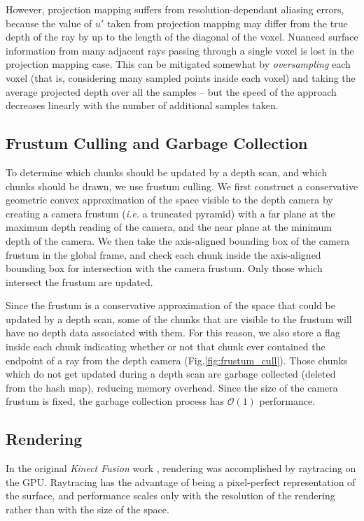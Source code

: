 \documentclass[10pt,twocolumn,letterpaper]{article}
\newcommand{\figref}[1]{Fig.\ref{#1}}
\begin{document}
However, projection mapping suffers from resolution-dependant aliasing errors,
because the value of $u'$ taken from projection mapping may differ from the true
depth of the ray by up to the length of the diagonal of the voxel. Nuanced
surface information from many adjacent rays passing through a single voxel is
lost in the projection mapping case. This can be mitigated somewhat by
\textit{oversampling} each voxel (that is, considering many sampled points
inside each voxel) and taking the average projected depth over all the samples
-- but the speed of the approach decreases linearly with the number of 
additional samples taken. 

\subsection{Frustum Culling and Garbage Collection}
To determine which chunks should be updated by a depth scan, and which chunks
should be drawn, we use frustum culling. We first construct a conservative
geometric convex approximation of the space visible to the depth camera by
creating a camera frustum (\textit{i.e.} a truncated pyramid) with a far plane
at the maximum depth reading of the camera, and the near plane at the minimum
depth of the camera. We then take the axis-aligned bounding box of the camera
frustum in the global frame, and check each chunk inside the axis-aligned
bounding box for intersection with the camera frustum. Only those which
intersect the frustum are updated. 

Since the frustum is a conservative approximation of the space that could be
updated by a depth scan, some of the chunks that are visible to the frustum will
have no depth data associated with them. For this reason, we also store a flag
inside each chunk indicating whether or not that chunk ever contained the
endpoint of a ray from the depth camera (\figref{fig:frustum_cull}). Those
chunks which do not get updated during a depth scan are garbage collected
(deleted from the hash map), reducing memory overhead. Since the size of the
camera frustum is fixed, the garbage collection process has $\mathcal{O}(1)$
performance.

\subsection{Rendering}
In the original \textit{Kinect Fusion} work \cite{Newcombe}, rendering was
accomplished by raytracing on the GPU. Raytracing has the advantage of being a
pixel-perfect representation of the surface, and performance scales only with
the resolution of the rendering rather than with the size of the space. 
\end{document}
